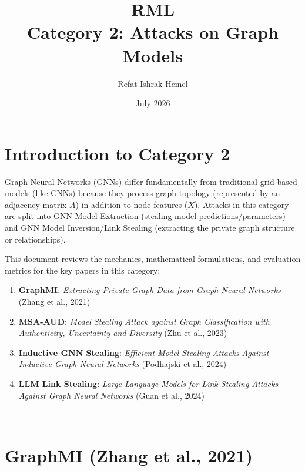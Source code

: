 \documentclass{article}
\title{RML\\
\large Category 2: Attacks on Graph Models}
\author{Refat Ishrak Hemel}
\date{July 2026}
\begin{document}
\maketitle

\section{Introduction to Category 2}
Graph Neural Networks (GNNs) differ fundamentally from traditional grid-based models (like CNNs) because they process graph topology (represented by an adjacency matrix $A$) in addition to node features ($X$). Attacks in this category are split into GNN Model Extraction (stealing model predictions/parameters) and GNN Model Inversion/Link Stealing (extracting the private graph structure or relationships).

This document reviews the mechanics, mathematical formulations, and evaluation metrics for the key papers in this category:
\begin{enumerate}
    \item \textbf{GraphMI}: \textit{Extracting Private Graph Data from Graph Neural Networks} (Zhang et al., 2021)
    \item \textbf{MSA-AUD}: \textit{Model Stealing Attack against Graph Classification with Authenticity, Uncertainty and Diversity} (Zhu et al., 2023)
    \item \textbf{Inductive GNN Stealing}: \textit{Efficient Model-Stealing Attacks Against Inductive Graph Neural Networks} (Podhajski et al., 2024)
    \item \textbf{LLM Link Stealing}: \textit{Large Language Models for Link Stealing Attacks Against Graph Neural Networks} (Guan et al., 2024)
\end{enumerate}

---

\section{GraphMI (Zhang et al., 2021)}
\end{document}
